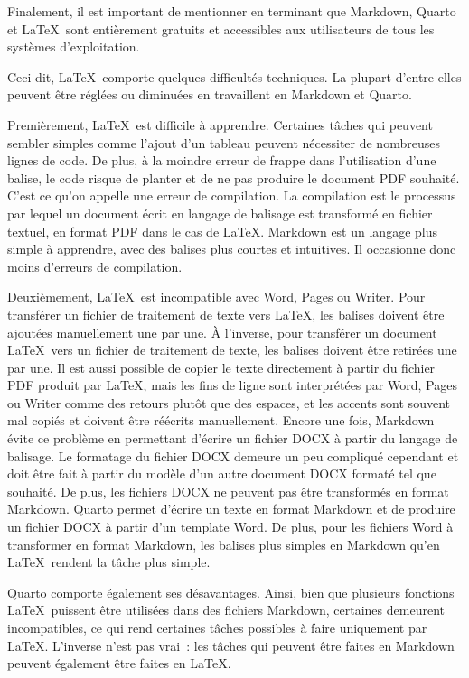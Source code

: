 \documentclass[
  letterpaper,
]{scrbook}
\begin{document}
Finalement, il est important de mentionner en terminant que Markdown,
Quarto et \LaTeX~sont entièrement gratuits et accessibles aux
utilisateurs de tous les systèmes d'exploitation.

Ceci dit, \LaTeX~comporte quelques difficultés techniques. La plupart
d'entre elles peuvent être réglées ou diminuées en travaillent en
Markdown et Quarto.

Premièrement, \LaTeX~est difficile à apprendre. Certaines tâches qui
peuvent sembler simples comme l'ajout d'un tableau peuvent nécessiter de
nombreuses lignes de code. De plus, à la moindre erreur de frappe dans
l'utilisation d'une balise, le code risque de planter et de ne pas
produire le document PDF souhaité. C'est ce qu'on appelle une erreur de
compilation. La compilation est le processus par lequel un document
écrit en langage de balisage est transformé en fichier textuel, en
format PDF dans le cas de \LaTeX. Markdown est un langage plus simple à
apprendre, avec des balises plus courtes et intuitives. Il occasionne
donc moins d'erreurs de compilation.

Deuxièmement, \LaTeX~est incompatible avec Word, Pages ou Writer. Pour
transférer un fichier de traitement de texte vers \LaTeX, les balises
doivent être ajoutées manuellement une par une. À l'inverse, pour
transférer un document \LaTeX~vers un fichier de traitement de texte,
les balises doivent être retirées une par une. Il est aussi possible de
copier le texte directement à partir du fichier PDF produit par \LaTeX,
mais les fins de ligne sont interprétées par Word, Pages ou Writer comme
des retours plutôt que des espaces, et les accents sont souvent mal
copiés et doivent être réécrits manuellement. Encore une fois, Markdown
évite ce problème en permettant d'écrire un fichier DOCX à partir du
langage de balisage. Le formatage du fichier DOCX demeure un peu
compliqué cependant et doit être fait à partir du modèle d'un autre
document DOCX formaté tel que souhaité. De plus, les fichiers DOCX ne
peuvent pas être transformés en format Markdown. Quarto permet d'écrire
un texte en format Markdown et de produire un fichier DOCX à partir d'un
template Word. De plus, pour les fichiers Word à transformer en format
Markdown, les balises plus simples en Markdown qu'en \LaTeX~rendent la
tâche plus simple.

Quarto comporte également ses désavantages. Ainsi, bien que plusieurs
fonctions \LaTeX~puissent être utilisées dans des fichiers Markdown,
certaines demeurent incompatibles, ce qui rend certaines tâches
possibles à faire uniquement par \LaTeX. L'inverse n'est pas vrai~: les
tâches qui peuvent être faites en Markdown peuvent également être faites
en \LaTeX.
\end{document}

